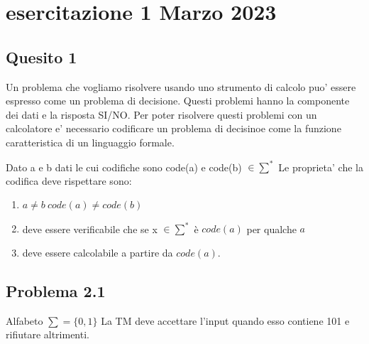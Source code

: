 \documentclass[a4paper, 12pt]{article}
\begin{document}
\section{esercitazione 1 Marzo 2023}
\subsection{Quesito 1}
Un problema che vogliamo risolvere usando uno strumento di calcolo puo' essere espresso come un problema di decisione. Questi problemi hanno la componente dei dati e la risposta SI/NO. Per poter risolvere questi problemi con un calcolatore e' necessario codificare un problema di decisinoe come la funzione caratteristica di un linguaggio formale.

Dato a e b dati le cui codifiche sono code(a) e code(b) $\in \sum^*$
Le proprieta' che la codifica deve rispettare sono: 
\begin{enumerate}
\item $a \ne b \ code(a) \neq code(b)$
\item deve essere verificabile che se x $\in \sum^*$ \`e $code(a)$ per qualche $a$
\item deve essere calcolabile a partire da $code(a).$
\end{enumerate}
\subsection{Problema 2.1}
Alfabeto $\sum = \{0,1\}$
La TM deve accettare l'input quando esso contiene 101 e rifiutare altrimenti.\\
\end{document}
